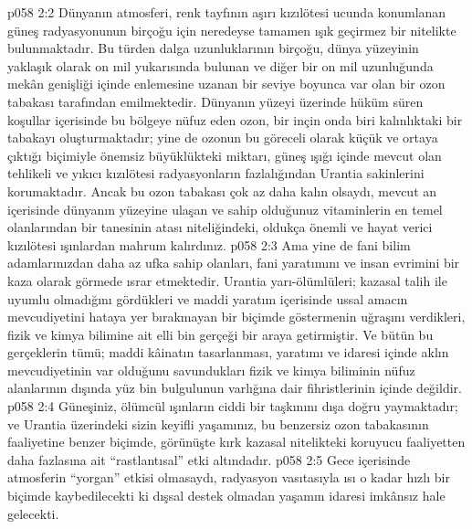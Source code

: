 \vs p058 2:2 Dünyanın atmosferi, renk tayfının aşırı kızılötesi ucunda konumlanan güneş radyasyonunun birçoğu için neredeyse tamamen ışık geçirmez bir nitelikte bulunmaktadır. Bu türden dalga uzunluklarının birçoğu, dünya yüzeyinin yaklaşık olarak on mil yukarısında bulunan ve diğer bir on mil uzunluğunda mekân genişliği içinde enlemesine uzanan bir seviye boyunca var olan bir ozon tabakası tarafından emilmektedir. Dünyanın yüzeyi üzerinde hüküm süren koşullar içerisinde bu bölgeye nüfuz eden ozon, bir inçin onda biri kalınlıktaki bir tabakayı oluşturmaktadır; yine de ozonun bu göreceli olarak küçük ve ortaya çıktığı biçimiyle önemsiz büyüklükteki miktarı, güneş ışığı içinde mevcut olan tehlikeli ve yıkıcı kızılötesi radyasyonların fazlalığından Urantia sakinlerini korumaktadır. Ancak bu ozon tabakası çok az daha kalın olsaydı, mevcut an içerisinde dünyanın yüzeyine ulaşan ve sahip olduğunuz vitaminlerin en temel olanlarından bir tanesinin atası niteliğindeki, oldukça önemli ve hayat verici kızılötesi ışınlardan mahrum kalırdınız.
\vs p058 2:3 Ama yine de fani bilim adamlarınızdan daha az ufka sahip olanları, fani yaratımını ve insan evrimini bir kaza olarak görmede ısrar etmektedir. Urantia yarı\hyp{}ölümlüleri; kazasal talih ile uyumlu olmadığını gördükleri ve maddi yaratım içerisinde ussal amacın mevcudiyetini hataya yer bırakmayan bir biçimde göstermenin uğraşını verdikleri, fizik ve kimya bilimine ait elli bin gerçeği bir araya getirmiştir. Ve bütün bu gerçeklerin tümü; maddi kâinatın tasarlanması, yaratımı ve idaresi içinde aklın mevcudiyetinin var olduğunu savundukları fizik ve kimya biliminin nüfuz alanlarının dışında yüz bin bulgulunun varlığına dair fihristlerinin içinde değildir.
\vs p058 2:4 Güneşiniz, ölümcül ışınların ciddi bir taşkınını dışa doğru yaymaktadır; ve Urantia üzerindeki sizin keyifli yaşamınız, bu benzersiz ozon tabakasının faaliyetine benzer biçimde, görünüşte kırk kazasal nitelikteki koruyucu faaliyetten daha fazlasına ait “rastlantısal” etki altındadır.
\vs p058 2:5 Gece içerisinde atmosferin “yorgan” etkisi olmasaydı, radyasyon vasıtasıyla ısı o kadar hızlı bir biçimde kaybedilecekti ki dışsal destek olmadan yaşamın idaresi imkânsız hale gelecekti.
